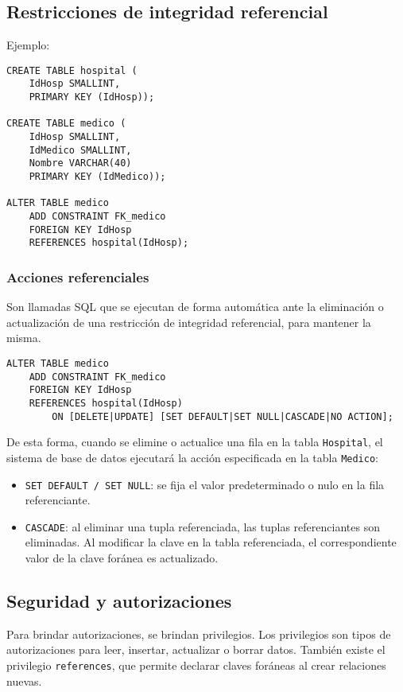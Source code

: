\documentclass[a4paper, twoside]{article}
\begin{document}
\subsection{Restricciones de integridad referencial}
Ejemplo: 
\begin{lstlisting}
CREATE TABLE hospital (
	IdHosp SMALLINT,
	PRIMARY KEY (IdHosp));

CREATE TABLE medico (
	IdHosp SMALLINT,
	IdMedico SMALLINT,
	Nombre VARCHAR(40)
	PRIMARY KEY (IdMedico));

ALTER TABLE medico
	ADD CONSTRAINT FK_medico 
	FOREIGN KEY IdHosp 
	REFERENCES hospital(IdHosp);
\end{lstlisting}

\subsubsection{Acciones referenciales}
Son llamadas SQL que se ejecutan de forma automática ante la eliminación o actualización de una restricción de integridad referencial, para mantener la misma.

\begin{lstlisting}
ALTER TABLE medico 
	ADD CONSTRAINT FK_medico 
	FOREIGN KEY IdHosp 
	REFERENCES hospital(IdHosp)
		ON [DELETE|UPDATE] [SET DEFAULT|SET NULL|CASCADE|NO ACTION];
\end{lstlisting}

De esta forma, cuando se elimine o actualice una fila en la tabla \texttt{Hospital}, el sistema de base de datos ejecutará la acción especificada en la tabla \texttt{Medico}:
\begin{itemize}
	\item \texttt{SET DEFAULT / SET NULL}: se fija el valor predeterminado o nulo en la fila referenciante.
	\item \texttt{CASCADE}: al eliminar una tupla referenciada, las tuplas referenciantes son eliminadas. Al modificar la clave en la tabla referenciada, el correspondiente valor de la clave foránea es actualizado.
\end{itemize}

\subsection{Seguridad y autorizaciones}
Para brindar autorizaciones, se brindan privilegios. Los privilegios son tipos de autorizaciones para leer, insertar, actualizar o borrar datos. También existe el privilegio \texttt{references}, que permite declarar claves foráneas al crear relaciones nuevas.
\end{document}
